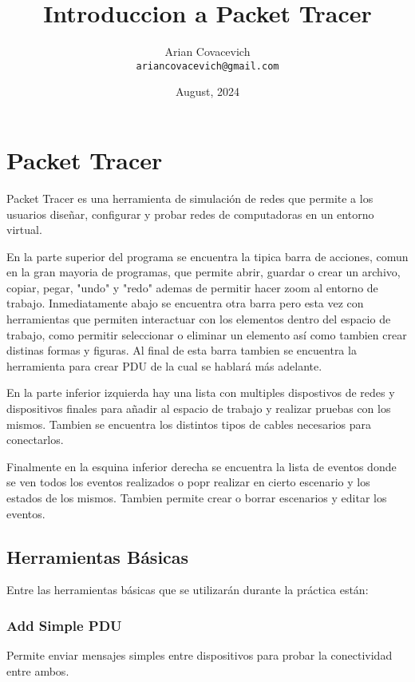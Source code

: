 \documentclass{article}
\title{Introduccion a Packet Tracer}
\author{Arian Covacevich \\ \texttt{ariancovacevich@gmail.com}}
\date{August, 2024}
\begin{document}

\maketitle

\section{Packet Tracer}
\hspace{1cm}
Packet Tracer es una herramienta de simulación de redes que permite a los usuarios diseñar, configurar y probar redes de computadoras en un entorno virtual.

\vspace{1em}\hspace{0.5cm}
En la parte superior del programa se encuentra la tipica barra de acciones, comun en la gran mayoria de programas, que permite abrir, guardar o crear un archivo, copiar, pegar, "undo" y "redo" ademas de permitir hacer zoom al entorno de trabajo.
Inmediatamente abajo se encuentra otra barra pero esta vez con herramientas que permiten interactuar con los elementos dentro del espacio de trabajo, como permitir seleccionar o eliminar un elemento así como tambien crear distinas formas y figuras. Al final de esta barra tambien se encuentra la herramienta para crear PDU de la cual se hablará más adelante.

\vspace{1em}\hspace{0.5cm}
En la parte inferior izquierda hay una lista con multiples dispostivos de redes y dispositivos finales para añadir al espacio de trabajo y realizar pruebas con los mismos. Tambien se encuentra los distintos tipos de cables necesarios para conectarlos.

\vspace{1em}\hspace{0.5cm}
Finalmente en la esquina inferior derecha se encuentra la lista de eventos donde se ven todos los eventos realizados o popr realizar en cierto escenario y los estados de los mismos. Tambien permite crear o borrar escenarios y editar los eventos.
\subsection{Herramientas Básicas}
\hspace{1cm}
Entre las herramientas básicas que se utilizarán durante la práctica están:

\subsubsection{Add Simple PDU}
\hspace{1cm}
Permite enviar mensajes simples entre dispositivos para probar la conectividad entre ambos.
\end{document}
